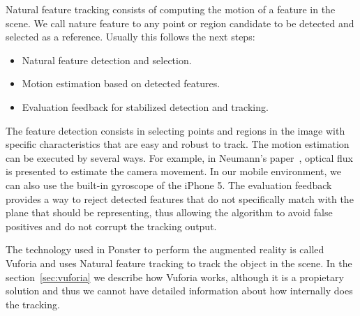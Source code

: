 Natural feature tracking consists of computing the motion of a feature in the
scene\cite{neumann}. We call nature feature to any point or
region candidate to be detected and selected as a reference. Usually this
follows the next steps: 
\begin{itemize}
\item Natural feature detection and selection.
\item Motion estimation based on detected features.
\item Evaluation feedback for stabilized detection and tracking.
\end{itemize}
The feature detection consists in selecting points and regions in the image
with specific characteristics that are easy and robust to track. The motion
estimation can be executed by several ways. For example, in Neumann's
paper~\cite{neumann}, optical  
flux is presented to estimate the camera movement. In our mobile environment,
we can also use the built-in gyroscope of the iPhone 5. The evaluation feedback provides a way to reject
detected features that do not specifically match with the plane that should be
representing, thus allowing the algorithm to avoid false positives and do not
corrupt the tracking output.

The technology used in Ponster to perform the augmented reality is called
Vuforia and uses Natural feature tracking to track the object in the scene. In
the section~\ref{sec:vuforia} we describe how Vuforia works, although it is a
propietary solution and thus we cannot have detailed information about how
internally does the tracking. 

